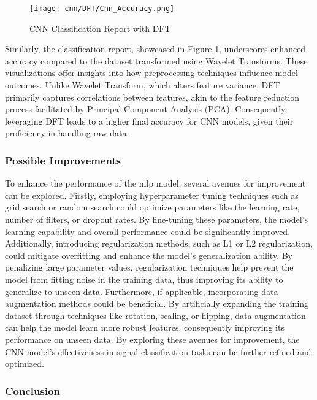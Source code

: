 \begin{figure}[H] 
    \centering
    \texttt{[image: cnn/DFT/Cnn\_Accuracy.png]}
    \caption{CNN Classification Report with DFT}\label{fig:cnn_classification_report_DFT}
\end{figure}

Similarly, the classification report, showcased in Figure \ref{fig:cnn_classification_report_DFT}, underscores enhanced accuracy compared to the dataset transformed using Wavelet Transforms. These visualizations offer insights into how preprocessing techniques influence model outcomes. Unlike Wavelet Transform, which alters feature variance, DFT primarily captures correlations between features, akin to the feature reduction process facilitated by Principal Component Analysis (PCA). Consequently, leveraging DFT leads to a higher final accuracy for CNN models, given their proficiency in handling raw data.

\subsubsection{Possible Improvements}

To enhance the performance of the \acrshort{mlp} model, several avenues for improvement can be explored. Firstly, employing hyperparameter tuning techniques such as grid search or random search could optimize parameters like the learning rate, number of filters, or dropout rates. By fine-tuning these parameters, the model's learning capability and overall performance could be significantly improved. Additionally, introducing regularization methods, such as L1 or L2 regularization, could mitigate overfitting and enhance the model's generalization ability. By penalizing large parameter values, regularization techniques help prevent the model from fitting noise in the training data, thus improving its ability to generalize to unseen data. Furthermore, if applicable, incorporating data augmentation methods could be beneficial. By artificially expanding the training dataset through techniques like rotation, scaling, or flipping, data augmentation can help the model learn more robust features, consequently improving its performance on unseen data. By exploring these avenues for improvement, the CNN model's effectiveness in signal classification tasks can be further refined and optimized.

\subsubsection{Conclusion}

